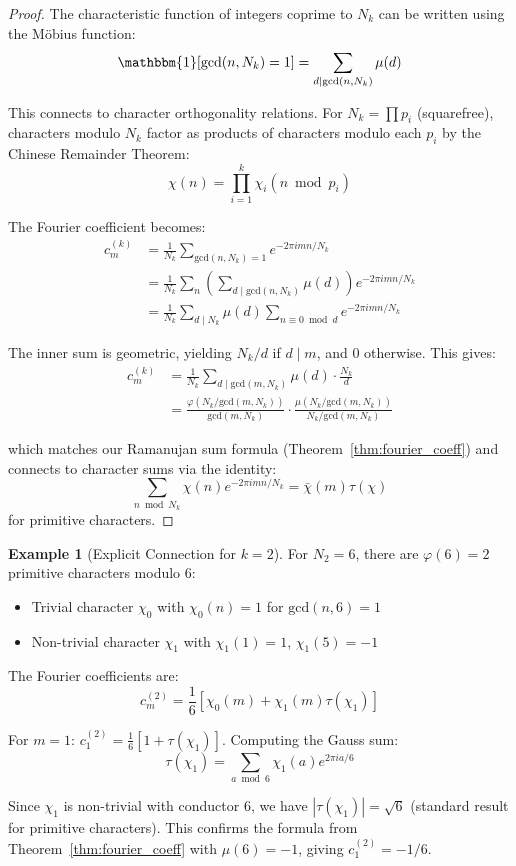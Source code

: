 ﻿\documentclass[12pt,a4paper]{report}
\theoremstyle{plain}
\theoremstyle{definition}
\newtheorem{example}[theorem]{Example}
\renewcommand{\gcd}{\text{gcd}}
\renewcommand{\phi}{\varphi}
\begin{document}
\begin{proof}
The characteristic function of integers coprime to $N_k$ can be written using the M\"obius function:
\[
\mathbbm{1}[\gcd(n,N_k)=1] = \sum_{d \mid \gcd(n,N_k)} \mu(d)
\]

This connects to character orthogonality relations. For $N_k = \prod p_i$ (squarefree), characters modulo $N_k$ factor as products of characters modulo each $p_i$ by the Chinese Remainder Theorem:
\[
\chi(n) = \prod_{i=1}^k \chi_i(n \bmod p_i)
\]

The Fourier coefficient becomes:
\begin{align*}
c_m^{(k)} &= \frac{1}{N_k} \sum_{\gcd(n,N_k)=1} e^{-2\pi imn/N_k} \\
&= \frac{1}{N_k} \sum_n \left(\sum_{d \mid \gcd(n,N_k)} \mu(d)\right) e^{-2\pi imn/N_k} \\
&= \frac{1}{N_k} \sum_{d \mid N_k} \mu(d) \sum_{n \equiv 0 \bmod d} e^{-2\pi imn/N_k}
\end{align*}

The inner sum is geometric, yielding $N_k/d$ if $d \mid m$, and $0$ otherwise. This gives:
\begin{align*}
c_m^{(k)} &= \frac{1}{N_k} \sum_{d \mid \gcd(m,N_k)} \mu(d) \cdot \frac{N_k}{d} \\
&= \frac{\phi(N_k/\gcd(m,N_k))}{\gcd(m,N_k)} \cdot \frac{\mu(N_k/\gcd(m,N_k))}{N_k/\gcd(m,N_k)}
\end{align*}

which matches our Ramanujan sum formula (Theorem~\ref{thm:fourier_coeff}) and connects to character sums via the identity:
\[
\sum_{n \bmod N_k} \chi(n) e^{-2\pi imn/N_k} = \bar{\chi}(m) \tau(\chi)
\]
for primitive characters.
\end{proof}

\begin{example}[Explicit Connection for $k=2$]
\label{ex:dirichlet_k2}
For $N_2 = 6$, there are $\phi(6) = 2$ primitive characters modulo 6:
\begin{itemize}
    \item Trivial character $\chi_0$ with $\chi_0(n) = 1$ for $\gcd(n,6)=1$
    \item Non-trivial character $\chi_1$ with $\chi_1(1)=1$, $\chi_1(5)=-1$
\end{itemize}

The Fourier coefficients are:
\[
c_m^{(2)} = \frac{1}{6}[\chi_0(m) + \chi_1(m)\tau(\chi_1)]
\]

For $m=1$: $c_1^{(2)} = \frac{1}{6}[1 + \tau(\chi_1)]$. Computing the Gauss sum:
\[
\tau(\chi_1) = \sum_{a \bmod 6} \chi_1(a) e^{2\pi ia/6}
\]

Since $\chi_1$ is non-trivial with conductor 6, we have $|\tau(\chi_1)| = \sqrt{6}$ (standard result for primitive characters). This confirms the formula from Theorem~\ref{thm:fourier_coeff} with $\mu(6) = -1$, giving $c_1^{(2)} = -1/6$.
\end{example}
\end{document}
